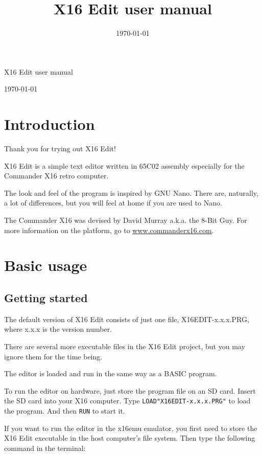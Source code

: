 \documentclass{article}
\title{X16 Edit user manual}
\date{\today}
\begin{document}
\begin{huge}
    X16 Edit user manual
\end{huge}

\vspace{1em}
\today

\vspace{4em}
\tableofcontents
\vspace{4em}

\section{Introduction}

Thank you for trying out X16 Edit!

X16 Edit is a simple text editor written in 65C02 assembly especially
for the Commander X16 retro computer. 

The look and feel of the program is inspired by GNU Nano. There are,
naturally, a lot of differences, but you will feel at home if you are
used to Nano.

The Commander X16 was devised by David Murray a.k.a. the 
8-Bit Guy. For more information on the platform, go to 
\href{http://www.commanderx16.com}{www.commanderx16.com}.

\section{Basic usage}
 
    \subsection{Getting started}
        The default version of X16 Edit consists of just one file, 
        X16EDIT-x.x.x.PRG, where x.x.x is the version number.
 
        There are several more executable files in the X16 Edit project, but you may
        ignore them for the time being.
 
        The editor is loaded and run in the same way as a BASIC program.
        
        To run the editor on hardware, just store the program file
        on an SD card. Insert the SD card into your X16 computer. Type
        \texttt{LOAD"X16EDIT-x.x.x.PRG"} to load the program. And then \texttt{RUN} to start it.
 
        If you want to run the editor in the x16emu emulator, you first need to 
        store the X16 Edit executable in the host computer's file system.
        Then type the following command in the terminal:
 
\end{document}
